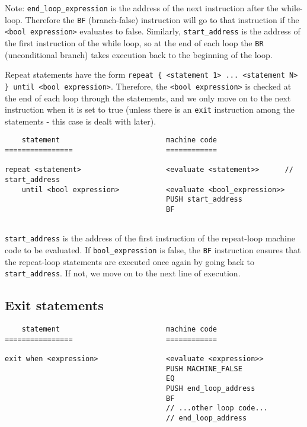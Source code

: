 \documentclass[11pt]{article}
\begin{document}
Note: \texttt{end\_loop\_expression} is the address of the next instruction after the while-loop. Therefore the \texttt{BF} (branch-false) instruction will go to that instruction if the \texttt{<bool expression>} evaluates to false. Similarly, \texttt{start\_address} is the address of the first instruction of the while loop, so at the end of each loop the \texttt{BR} (unconditional branch) takes execution back to the beginning of the loop.

Repeat statements have the form \texttt{repeat \{ <statement 1> ... <statement N> \} until <bool expression>}. Therefore, the \texttt{<bool expression>} is checked at the end of each loop through the statements, and we only move on to the next instruction when it is set to true (unless there is an \texttt{exit} instruction among the statements - this case is dealt with later).

\begin{verbatim}
    statement                         machine code
================                      ============

repeat <statement>                    <evaluate <statement>>      // start_address
    until <bool expression>           <evaluate <bool_expression>>
                                      PUSH start_address
                                      BF


\end{verbatim}

\texttt{start\_address} is the address of the first instruction of the repeat-loop machine code to be evaluated. If \texttt{bool\_expression} is false, the \texttt{BF} instruction ensures that the repeat-loop statements are executed once again by going back to \texttt{start\_address}. If not, we move on to the next line of execution.

\subsection{Exit statements}

\begin{verbatim}
    statement                         machine code
================                      ============

exit when <expression>                <evaluate <expression>>
                                      PUSH MACHINE_FALSE
                                      EQ
                                      PUSH end_loop_address
                                      BF
                                      // ...other loop code...
                                      // end_loop_address



\end{verbatim}
\end{document}
